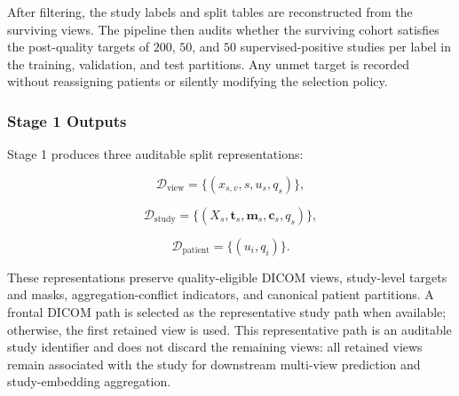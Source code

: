 After filtering, the study labels and split tables are reconstructed from the surviving views. The pipeline then audits whether the surviving cohort satisfies the post-quality targets of $200$, $50$, and $50$ supervised-positive studies per label in the training, validation, and test partitions. Any unmet target is recorded without reassigning patients or silently modifying the selection policy.

\subsubsection{Stage 1 Outputs}

Stage 1 produces three auditable split representations:

\[
\mathcal{D}_{\mathrm{view}}
=
\{(x_{s,v},s,u_s,q_s)\},
\]

\[
\mathcal{D}_{\mathrm{study}}
=
\{(X_s,\mathbf{t}_s,\mathbf{m}_s,\mathbf{c}_s,q_s)\},
\]

\[
\mathcal{D}_{\mathrm{patient}}
=
\{(u_i,q_i)\}.
\]

These representations preserve quality-eligible DICOM views, study-level targets and masks, aggregation-conflict indicators, and canonical patient partitions. A frontal DICOM path is selected as the representative study path when available; otherwise, the first retained view is used. This representative path is an auditable study identifier and does not discard the remaining views: all retained views remain associated with the study for downstream multi-view prediction and study-embedding aggregation.
